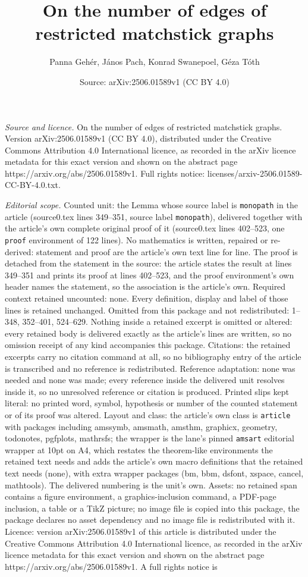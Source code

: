 \documentclass[10pt,a4paper]{amsart}
\title[On the number of edges of restricted matchstick graphs]{On the number of edges of restricted matchstick graphs}
\author{Panna Geh\'er, J\'anos Pach, Konrad Swanepoel, G\'eza T\'oth}
\date{Source: arXiv:2506.01589v1 (CC BY 4.0)}
\begin{document}
\maketitle

\noindent\emph{Source and licence.} On the number of edges of restricted matchstick graphs. Version arXiv:2506.01589v1 (CC BY 4.0), distributed under the Creative Commons Attribution 4.0 International licence, as recorded in the arXiv licence metadata for this exact version and shown on the abstract page https://arxiv.org/abs/2506.01589v1. Full rights notice: licenses/arxiv-2506.01589-CC-BY-4.0.txt.\par\smallskip

\noindent\textit{Editorial scope.} Counted unit: the Lemma whose source label is \texttt{monopath} in the article (source0.tex lines 349--351, source label \texttt{monopath}), delivered together with the article's own complete original proof of it (source0.tex lines 402--523, one \texttt{proof} environment of 122 lines). No mathematics is written, repaired or re-derived: statement and proof are the article's own text line for line. The proof is detached from the statement in the source: the article states the result at lines 349--351 and prints its proof at lines 402--523, and the proof environment's own header names the statement, so the association is the article's own. Required context retained uncounted: none. Every definition, display and label of those lines is retained unchanged. Omitted from this package and not redistributed: 1--348, 352--401, 524--629. Nothing inside a retained excerpt is omitted or altered: every retained body is delivered exactly as the article's lines are written, so no omission receipt of any kind accompanies this package. Citations: the retained excerpts carry no citation command at all, so no bibliography entry of the article is transcribed and no reference is redistributed. Reference adaptation: none was needed and none was made; every reference inside the delivered unit resolves inside it, so no unresolved reference or citation is produced. Printed slips kept literal: no printed word, symbol, hypothesis or number of the counted statement or of its proof was altered. Layout and class: the article's own class is \texttt{article} with packages including amssymb, amsmath, amsthm, graphicx, geometry, todonotes, pgfplots, mathrsfs; the wrapper is the lane's pinned \texttt{amsart} editorial wrapper at 10pt on A4, which restates the theorem-like environments the retained text needs and adds the article's own macro definitions that the retained text needs (none), with extra wrapper packages (bm, bbm, dsfont, xspace, cancel, mathtools). The delivered numbering is the unit's own. Assets: no retained span contains a figure environment, a graphics-inclusion command, a PDF-page inclusion, a table or a TikZ picture; no image file is copied into this package, the package declares no asset dependency and no image file is redistributed with it. Licence: version arXiv:2506.01589v1 of this article is distributed under the Creative Commons Attribution 4.0 International licence, as recorded in the arXiv licence metadata for this exact version and shown on the abstract page https://arxiv.org/abs/2506.01589v1. A full rights notice is 
\end{document}
